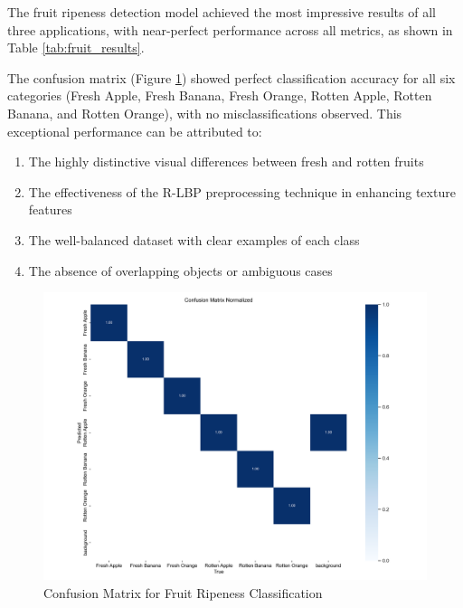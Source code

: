 \begin{multicols}{2}
The fruit ripeness detection model achieved the most impressive results of all three applications, with near-perfect performance across all metrics, as shown in Table \ref{tab:fruit_results}.

The confusion matrix (Figure \ref{fig:fruit_confusion}) showed perfect classification accuracy for all six categories (Fresh Apple, Fresh Banana, Fresh Orange, Rotten Apple, Rotten Banana, and Rotten Orange), with no misclassifications observed. This exceptional performance can be attributed to:
\begin{enumerate}
    \item The highly distinctive visual differences between fresh and rotten fruits
    \item The effectiveness of the R-LBP preprocessing technique in enhancing texture features
    \item The well-balanced dataset with clear examples of each class
    \item The absence of overlapping objects or ambiguous cases
\end{enumerate}
\end{multicols}
\begin{figure}[ht]
\centering
\includegraphics[width=0.8\linewidth]{datas/agriculture/confusion_matrix_normalized.png}
\caption{Confusion Matrix for Fruit Ripeness Classification}
\label{fig:fruit_confusion}
\end{figure}
